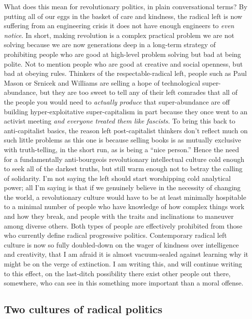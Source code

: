 \documentclass[a4paper,12pt,margin=.5in]{article}
\begin{document}
What does this mean for revolutionary politics, in plain conversational
terms? By putting all of our eggs in the basket of care and kindness,
the radical left is now suffering from an engineering crisis it does not
have enough engineers to \emph{even notice}. In short, making revolution
is a complex practical problem we are not solving because we are now
generations deep in a long-term strategy of prohibiting people who are
good at high-level problem solving but bad at being polite. Not to
mention people who are good at creative and social openness, but bad at
obeying rules. Thinkers of the respectable-radical left, people such as
Paul Mason or Srnicek and Williams are selling a hope of technological
super-abundance, but they are too sweet to tell any of their left
comrades that all of the people you would need to \emph{actually
produce} that super-abundance are off building hyper-exploitative
super-capitalism in part because they once went to an activist meeting
\emph{and everyone treated them like fascists.} To bring this back to
anti-capitalist basics, the reason left post-capitalist thinkers don't
reflect much on such little problems as this one is because selling
books is as mutually exclusive with truth-telling, in the short run, as
is being a ``nice person.'' Hence the need for a fundamentally
anti-bourgeois revolutionary intellectual culture cold enough to seek
all of the darkest truths, but still warm enough not to betray the
calling of solidarity. I'm not saying the left should start worshipping
cold analytical power; all I'm saying is that if we genuinely believe in
the necessity of changing the world, a revolutionary culture would have
to be at least minimally hospitable to a minimal number of people who
have knowledge of how complex things work and how they break, and people
with the traits and inclinations to maneuver among diverse others. Both
types of people are effectively prohibited from those who currently
define radical progressive politics. Contemporary radical left culture
is now so fully doubled-down on the wager of kindness over intelligence
and creativity, that I am afraid it is almost vacuum-sealed against
learning why it might be on the verge of extinction. I am writing this,
and will continue writing to this effect, on the last-ditch possibility
there exist other people out there, somewhere, who can see in this
something more important than a moral offense.

\subsection{Two cultures of radical
politics}\label{two-cultures-of-radical-politics}
\end{document}
